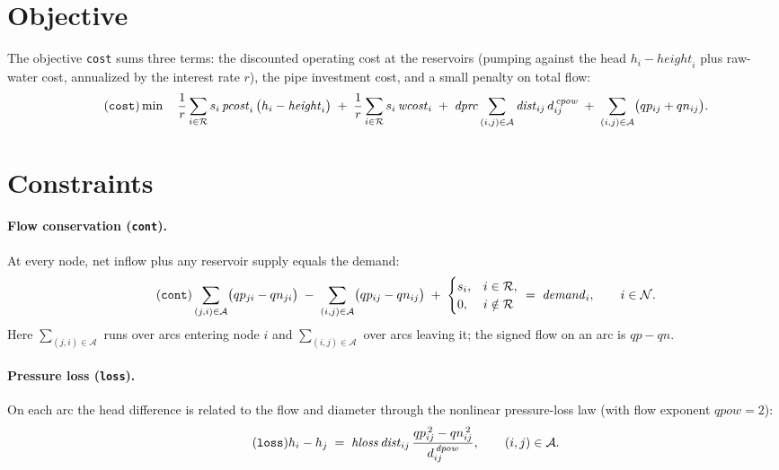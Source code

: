 \documentclass[11pt]{article}
\newcommand{\R}{\mathcal{R}}   %
\newcommand{\N}{\mathcal{N}}   %
\newcommand{\A}{\mathcal{A}}   %
\begin{document}
\section{Objective}

The objective \texttt{cost} sums three terms: the discounted operating cost at
the reservoirs (pumping against the head $h_i-\mathit{height}_i$ plus raw-water
cost, annualized by the interest rate $r$), the pipe investment cost, and a
small penalty on total flow:
\begin{equation}
\tag{\texttt{cost}}
\min\quad
\frac{1}{r}\sum_{i\in\R} s_i\,\mathit{pcost}_i\,\bigl(h_i - \mathit{height}_i\bigr)
\;+\; \frac{1}{r}\sum_{i\in\R} s_i\,\mathit{wcost}_i
\;+\; \mathit{dprc}\sum_{(i,j)\in\A}\mathit{dist}_{ij}\,d_{ij}^{\,\mathit{cpow}}
\;+\; \sum_{(i,j)\in\A}\bigl(qp_{ij} + qn_{ij}\bigr).
\end{equation}

\section{Constraints}

\paragraph{Flow conservation (\texttt{cont}).}
At every node, net inflow plus any reservoir supply equals the demand:
\begin{equation}
\tag{\texttt{cont}}
\sum_{(j,i)\in\A}\bigl(qp_{ji} - qn_{ji}\bigr)
\;-\; \sum_{(i,j)\in\A}\bigl(qp_{ij} - qn_{ij}\bigr)
\;+\; \begin{cases} s_i, & i\in\R,\\ 0, & i\notin\R \end{cases}
\;=\; \mathit{demand}_i,
\qquad i\in\N.
\end{equation}
Here $\sum_{(j,i)\in\A}$ runs over arcs entering node $i$ and
$\sum_{(i,j)\in\A}$ over arcs leaving it; the signed flow on an arc is
$qp - qn$.

\paragraph{Pressure loss (\texttt{loss}).}
On each arc the head difference is related to the flow and diameter through the
nonlinear pressure-loss law (with flow exponent $\mathit{qpow}=2$):
\begin{equation}
\tag{\texttt{loss}}
h_i - h_j
\;=\; \mathit{hloss}\,\mathit{dist}_{ij}\,
   \frac{qp_{ij}^{\,2} - qn_{ij}^{\,2}}{d_{ij}^{\,\mathit{dpow}}},
\qquad (i,j)\in\A.
\end{equation}
\end{document}
